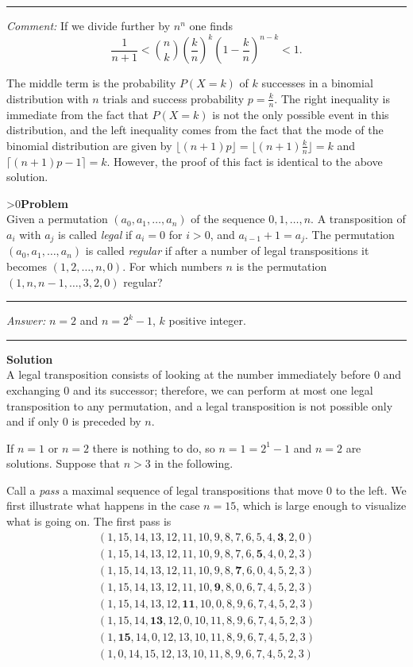\documentclass[12pt,oneside,a4paper]{book}
\newcounter{probnum}
\newcounter{solnum}
\newcommand{\prob}{\ifnum\value{probnum}>0\newpage\fi\setcounter{solnum}{0}\stepcounter{probnum}\textbf{Problem \theprobnum}\\}
\newcommand{\ans}{\medskip\hrule\medbreak\emph{Answer: }}
\newcommand{\comment}{\medskip\hrule\medbreak\emph{Comment: }}
\newcommand{\sol}{\medskip\hrule\medbreak\textbf{Solution}\\}
\begin{document}
\comment If we divide further by $n^n$ one finds
\[\frac1{n+1} < \binom nk \left(\frac kn\right)^k\left(1-\frac kn\right)^{n-k} < 1.\]

The middle term is the probability $P(X=k)$ of $k$ successes in a binomial distribution with $n$ trials and success probability $p=\frac kn$. The right inequality is immediate from the fact that $P(X=k)$ is not the only possible event in this distribution, and the left inequality comes from the fact that the mode of the binomial distribution are given by $\lfloor (n+1)p\rfloor = \lfloor (n+1)\frac kn \rfloor = k$ and $\lceil (n+1)p-1\rceil = k$. However, the proof of this fact is identical to the above solution.


\prob Given a permutation $(a_0,a_1,\ldots,a_n)$ of the sequence $0,1,\ldots,n$. A transposition of $a_i$ with $a_j$ is called \emph{legal} if $a_i=0$ for $i>0$, and $a_{i-1} + 1 = a_j$. The permutation $(a_0,a_1,\ldots,a_n)$ is called \emph{regular} if after a number of legal transpositions it becomes $(1,2,\ldots,n,0)$. For which numbers $n$ is the permutation $(1,n,n-1,\ldots,3,2,0)$ regular?

\ans $n=2$ and $n=2^k-1$, $k$ positive integer.

\sol
A legal transposition consists of looking at the number immediately before $0$ and exchanging $0$ and its successor; therefore, we can perform at most one legal transposition to any permutation, and a legal transposition is not possible only and if only $0$ is preceded by $n$.

If $n=1$ or $n=2$ there is nothing to do, so $n=1 = 2^1-1$ and $n=2$ are solutions. Suppose that $n>3$ in the following.

Call a \emph{pass} a maximal sequence of legal transpositions that move $0$ to the left. We first illustrate what happens in the case $n=15$, which is large enough to visualize what is going on. The first pass is
\begin{gather*}
(1,15,14,13,12,11,10,9,8,7,6,5,4,\mathbf{3},2,0)\\
(1,15,14,13,12,11,10,9,8,7,6,\mathbf{5},4,0,2,3)\\
(1,15,14,13,12,11,10,9,8,\mathbf{7},6,0,4,5,2,3)\\
(1,15,14,13,12,11,10,\mathbf{9},8,0,6,7,4,5,2,3)\\
(1,15,14,13,12,\mathbf{11},10,0,8,9,6,7,4,5,2,3)\\
(1,15,14,\mathbf{13},12,0,10,11,8,9,6,7,4,5,2,3)\\
(1,\mathbf{15},14,0,12,13,10,11,8,9,6,7,4,5,2,3)\\
(1,0,14,15,12,13,10,11,8,9,6,7,4,5,2,3)
\end{gather*}
\end{document}
